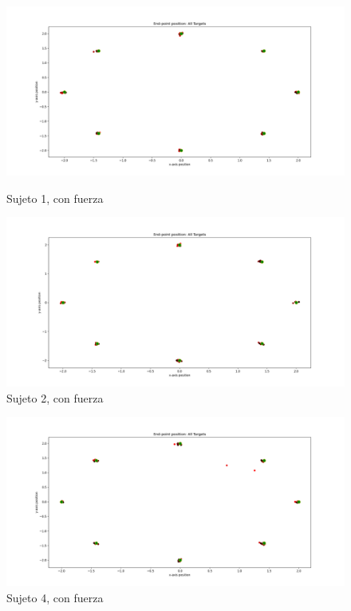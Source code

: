 \documentclass[a4paper,11pt, oneside]{book}
\begin{document}
\begin{figure}[H]
	\begin{minipage}[b]{0.5\linewidth}
		\centering
		\includegraphics[width=\linewidth]{sujeto1/force/trayectorias_puntos}
		\caption{Sujeto 1, con fuerza}
		\label{fig:figura1}
	\end{minipage}
	\hspace{0.5cm}
	\begin{minipage}[b]{0.5\linewidth}
		\centering
		\includegraphics[width=\linewidth]{sujeto2/force/trayectorias_puntos}
		\caption{Sujeto 2, con fuerza}
		\label{fig:figura2}
	\end{minipage}
\end{figure}
\begin{figure}[h!]
	\begin{minipage}[b]{0.5\linewidth}
		\centering
		\includegraphics[width=\linewidth]{sujeto4/force/trayectorias_puntos}
		\caption{Sujeto 4, con fuerza}
		\label{fig:figura1}
	\end{minipage}
\end{figure}
\end{document}
